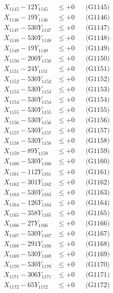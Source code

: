 \documentclass[a4paper,10pt]{article}
\begin{document}
{\begin{align}
X_{1145} - 12Y_{1145} &\leq +0 && \text{(G1145)} \\
X_{1146} - 19Y_{1146} &\leq +0 && \text{(G1146)} \\
X_{1147} - 530Y_{1147} &\leq +0 && \text{(G1147)} \\
X_{1148} - 530Y_{1148} &\leq +0 && \text{(G1148)} \\
X_{1149} - 19Y_{1149} &\leq +0 && \text{(G1149)} \\
X_{1150} - 200Y_{1150} &\leq +0 && \text{(G1150)} \\
\allowbreak
X_{1151} - 24Y_{1151} &\leq +0 && \text{(G1151)} \\
X_{1152} - 530Y_{1152} &\leq +0 && \text{(G1152)} \\
X_{1153} - 530Y_{1153} &\leq +0 && \text{(G1153)} \\
X_{1154} - 530Y_{1154} &\leq +0 && \text{(G1154)} \\
X_{1155} - 530Y_{1155} &\leq +0 && \text{(G1155)} \\
X_{1156} - 530Y_{1156} &\leq +0 && \text{(G1156)} \\
X_{1157} - 530Y_{1157} &\leq +0 && \text{(G1157)} \\
X_{1158} - 530Y_{1158} &\leq +0 && \text{(G1158)} \\
X_{1159} - 89Y_{1159} &\leq +0 && \text{(G1159)} \\
X_{1160} - 530Y_{1160} &\leq +0 && \text{(G1160)} \\
\allowbreak
X_{1161} - 112Y_{1161} &\leq +0 && \text{(G1161)} \\
X_{1162} - 301Y_{1162} &\leq +0 && \text{(G1162)} \\
X_{1163} - 530Y_{1163} &\leq +0 && \text{(G1163)} \\
X_{1164} - 126Y_{1164} &\leq +0 && \text{(G1164)} \\
X_{1165} - 358Y_{1165} &\leq +0 && \text{(G1165)} \\
X_{1166} - 27Y_{1166} &\leq +0 && \text{(G1166)} \\
X_{1167} - 530Y_{1167} &\leq +0 && \text{(G1167)} \\
X_{1168} - 291Y_{1168} &\leq +0 && \text{(G1168)} \\
X_{1169} - 530Y_{1169} &\leq +0 && \text{(G1169)} \\
X_{1170} - 530Y_{1170} &\leq +0 && \text{(G1170)} \\
\allowbreak
X_{1171} - 306Y_{1171} &\leq +0 && \text{(G1171)} \\
X_{1172} - 65Y_{1172} &\leq +0 && \text{(G1172)} \\

\end{align}}
\end{document}
